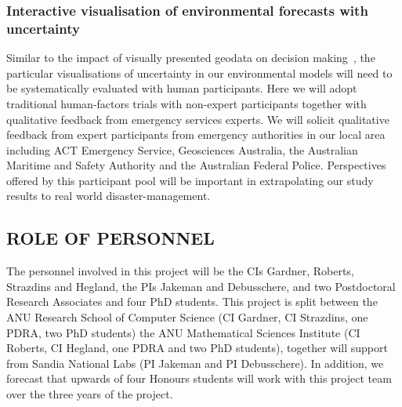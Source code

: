 \documentclass[a4paper,fontsize=12pt]{scrartcl}
\begin{document}
\subsubsection*{Interactive visualisation of environmental forecasts with uncertainty}

Similar to the impact of visually presented geodata on decision
making~\parencite{kinkeldey2015evaluating}, the particular
visualisations of uncertainty in our environmental models will need to
be systematically evaluated with human participants. Here we will
adopt traditional human-factors trials with non-expert participants
together with qualitative feedback from emergency services experts. We
will solicit qualitative feedback from expert participants from
emergency authorities in our local area including ACT Emergency
Service, Geosciences Australia, the Australian Maritime and Safety
Authority and the Australian Federal Police. Perspectives offered by
this participant pool will be important in extrapolating our study
results to real world disaster-management.




\subsection*{ROLE OF PERSONNEL}

%

The personnel involved in this project will be the CIs Gardner, Roberts, Strazdins and
Hegland, the PIs Jakeman and Debusschere, and two Postdoctoral Research Associates and four PhD students.
This project is split between the ANU Research School of Computer
Science (CI Gardner, CI Strazdins, one PDRA, two PhD students) the ANU
Mathematical Sciences Institute (CI Roberts, CI Hegland, one PDRA and two PhD
students), together will support from Sandia National Labs (PI Jakeman and PI  Debusschere). 
In addition, we forecast that upwards of four Honours
students will work with this project team over the three years of the
project.
\end{document}
